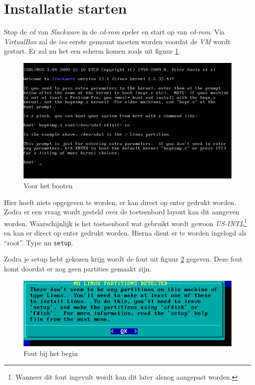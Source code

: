 \section{Installatie starten} 
Stop de \emph{cd} van \emph{Slackware} in de \emph{cd-rom} speler en start op van \emph{cd-rom}. Via \emph{VirtualBox} zal de \emph{iso} eerste gemount moeten worden voordat de \emph{VM} wordt gestart. Er zal nu het een scherm komen zoals uit figuur \ref{fig:home}.

\begin{figure}[H]
  \begin{center}
    \includegraphics[scale=0.5]{images/09_home}
  \end{center}
  \caption{Voor het booten}
  \label{fig:home}
\end{figure}

Hier hoeft niets opgegeven te worden, er kan direct op enter gedrukt worden. Zodra er een  vraag wordt gesteld over de toetsenbord layout kan dit aangeven worden. Waarschijnlijk is het toetsenbord wat gebruikt wordt gewoon \emph{US-INTL}\footnote{Wanneer dit fout ingevult wordt kan dit later alsnog aangepast worden.} en kan er direct op enter gedrukt worden. Hierna dient er te worden ingelogd als ``root''. Type nu \texttt{setup}.

Zodra je setup hebt gekozen krijg wordt de fout uit figuur \ref{fig:fout} gegeven. Deze fout komt doordat er nog geen partities gemaakt zijn.
\begin{figure}[H]
  \begin{center}
    \includegraphics[scale=0.5]{images/08_installer_fout}
  \end{center}
  \caption{Fout bij het begin}
  \label{fig:fout}
\end{figure}

